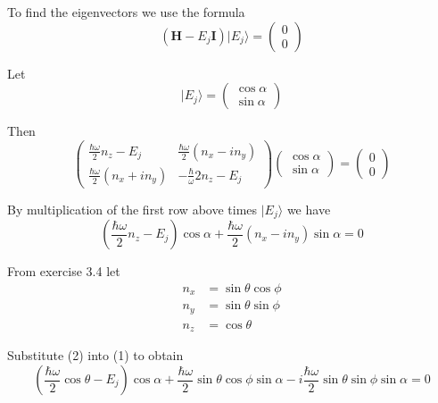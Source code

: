\documentclass[12pt]{article}
\begin{document}
To find the eigenvectors we use the formula
\begin{equation*}
(\mathbf H-E_j\mathbf I)|E_j\rangle=\begin{pmatrix}0\\0\end{pmatrix}
\end{equation*}

Let
\begin{equation*}
|E_j\rangle=\begin{pmatrix}\cos\alpha\\\sin\alpha\end{pmatrix}
\end{equation*}

Then
\begin{equation*}
\begin{pmatrix}
\frac{\hbar\omega}{2}n_z-E_j & \frac{\hbar\omega}{2}(n_x-in_y)
\\[1ex]
\frac{\hbar\omega}{2}(n_x+in_y) & -\frac{\hbar}{\omega}{2}n_z-E_j
\end{pmatrix}
\begin{pmatrix}\cos\alpha\\\sin\alpha\end{pmatrix}=\begin{pmatrix}0\\0\end{pmatrix}
\end{equation*}

By multiplication of the first row above times $|E_j\rangle$ we have
\begin{equation*}
\left(\frac{\hbar\omega}{2}n_z-E_j\right)\cos\alpha+\frac{\hbar\omega}{2}(n_x-in_y)\sin\alpha=0
\tag{1}
\end{equation*}

From exercise 3.4 let
\begin{equation*}
\begin{aligned}
n_x&=\sin\theta\cos\phi
\\
n_y&=\sin\theta\sin\phi
\\
n_z&=\cos\theta
\end{aligned}
\tag{2}
\end{equation*}

Substitute (2) into (1) to obtain
\begin{equation*}
\left(\frac{\hbar\omega}{2}\cos\theta-E_j\right)\cos\alpha
+\frac{\hbar\omega}{2}\sin\theta\cos\phi\sin\alpha
-i\frac{\hbar\omega}{2}\sin\theta\sin\phi\sin\alpha=0
\end{equation*}
\end{document}
